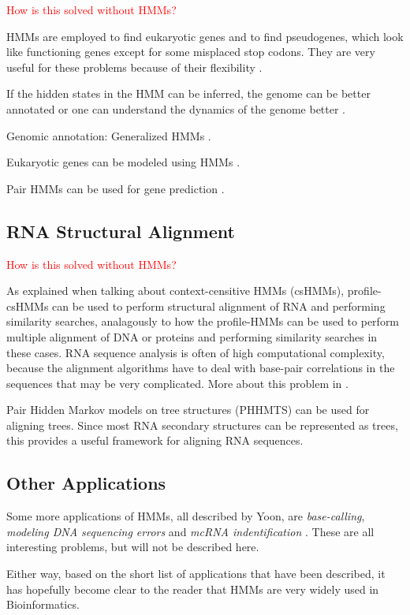 \documentclass{article}\usepackage[]{graphicx}\usepackage[]{color}
\begin{document}
\textcolor{red}{How is this solved without HMMs?}

HMMs are employed to find eukaryotic genes and to find pseudogenes, which look like functioning genes except for some misplaced stop codons. They are very useful for these problems because of their flexibility \cite{Christianini2006}.

If the hidden states in the HMM can be inferred, the genome can be better annotated or one can understand the dynamics of the genome better \cite{Christianini2006}.

Genomic annotation: Generalized HMMs \cite{Choo2004}.

Eukaryotic genes can be modeled using HMMs \cite{Yoon2009}. 

Pair HMMs can be used for gene prediction \cite{Yoon2009}.

\subsection{RNA Structural Alignment}\label{RNAStructuralAlignment}

\textcolor{red}{How is this solved without HMMs?}

As explained when talking about context-censitive HMMs (csHMMs), profile-csHMMs can be used to perform structural alignment of RNA and performing similarity searches, analagously to how the profile-HMMs can be used to perform multiple alignment of DNA or proteins and performing similarity searches in these cases. RNA sequence analysis is often of high computational complexity, because the alignment algorithms have to deal with base-pair correlations in the sequences that may be very complicated. More about this problem in \cite{Yoon2009}.

Pair Hidden Markov models on tree structures (PHHMTS) can be used for aligning trees. Since most RNA secondary structures can be represented as trees, this provides a useful framework for aligning RNA sequences. 

\subsection{Other Applications}
Some more applications of HMMs, all described by Yoon, are \textit{base-calling}, \textit{modeling DNA sequencing errors} and \textit{mcRNA indentification} \cite{Yoon2009}. These are all interesting problems, but will not be described here. 

Either way, based on the short list of applications that have been described, it has hopefully become clear to the reader that HMMs are very widely used in Bioinformatics. 
\end{document}
